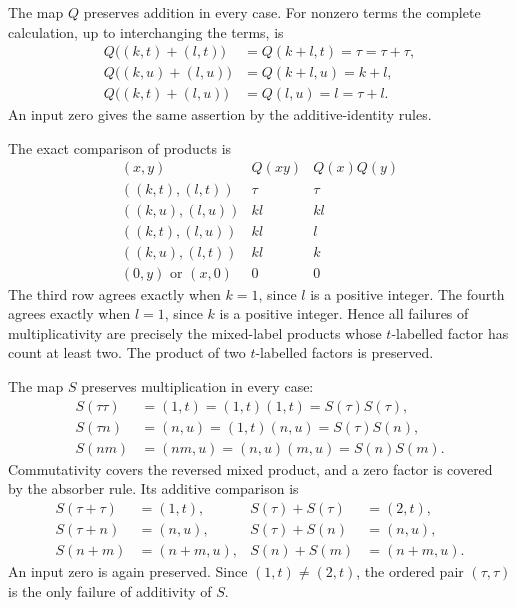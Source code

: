 The map \(Q\) preserves addition in every case.  For nonzero terms the
complete calculation, up to interchanging the terms, is
\[
\begin{aligned}
Q\bigl((k,t)+(l,t)\bigr)&=Q(k+l,t)=\tau=\tau+\tau,\\
Q\bigl((k,u)+(l,u)\bigr)&=Q(k+l,u)=k+l,\\
Q\bigl((k,t)+(l,u)\bigr)&=Q(l,u)=l=\tau+l.
\end{aligned}
\tag{LPC7}\label{eq:LPC7}
\]
An input zero gives the same assertion by the additive-identity rules.

The exact comparison of products is
\[
\begin{array}{c|c|c}
(x,y)&Q(xy)&Q(x)Q(y)\\ \hline
((k,t),(l,t))&\tau&\tau\\
((k,u),(l,u))&kl&kl\\
((k,t),(l,u))&kl&l\\
((k,u),(l,t))&kl&k\\
(0,y)\text{ or }(x,0)&0&0
\end{array}
\tag{LPC8}\label{eq:LPC8}
\]
The third row agrees exactly when \(k=1\), since \(l\) is a positive
integer.  The fourth agrees exactly when \(l=1\), since \(k\) is a
positive integer.  Hence all failures of multiplicativity are precisely
the mixed-label products whose \(t\)-labelled factor has count at least
two.  The product of two \(t\)-labelled factors is preserved.

The map \(S\) preserves multiplication in every case:
\[
\begin{aligned}
S(\tau\tau)&=(1,t)=(1,t)(1,t)=S(\tau)S(\tau),\\
S(\tau n)&=(n,u)=(1,t)(n,u)=S(\tau)S(n),\\
S(nm)&=(nm,u)=(n,u)(m,u)=S(n)S(m).
\end{aligned}
\tag{LPC9}\label{eq:LPC9}
\]
Commutativity covers the reversed mixed product, and a zero factor is
covered by the absorber rule.  Its additive comparison is
\[
\begin{aligned}
S(\tau+\tau)&=(1,t),&
S(\tau)+S(\tau)&=(2,t),\\
S(\tau+n)&=(n,u),&
S(\tau)+S(n)&=(n,u),\\
S(n+m)&=(n+m,u),&
S(n)+S(m)&=(n+m,u).
\end{aligned}
\tag{LPC10}\label{eq:LPC10}
\]
An input zero is again preserved.  Since \((1,t)\ne(2,t)\), the ordered
pair \((\tau,\tau)\) is the only failure of additivity of \(S\).

